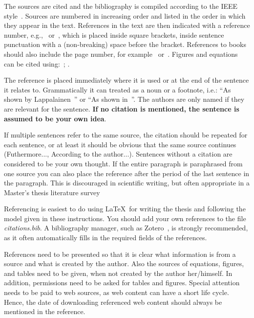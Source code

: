 The sources are cited and the bibliography is compiled according to
the IEEE style~\cite{ieeetransactions}.  Sources are numbered in
increasing order and listed in the order in which they appear in the
text.  References in the text are then indicated with a reference
number, e.g.,~\cite{lappalainen} or~\cite{lappalainen, acta, korpela},
which is placed inside square brackets, inside sentence punctuation
with a (non-breaking) space before the bracket. References to books
should also include the page number, for example~\cite[p.~15]{lappalainen}
or~\cite[pp.~15--17]{lappalainen}. Figures and equations can be cited
using:~\cite[Fig. 3]{lappalainen}; \cite[eq. (3)]{lappalainen}.

The reference is placed immediately where it is used or at the end of
the sentence it relates to. Grammatically it can treated as a noun or
a footnote, i.e.: ``As shown by Lappalainen~\cite{lappalainen}'' or
``As shown in~\cite{lappalainen}''. The authors are only named if they
are relevant for the sentence. \textbf{If no citation is mentioned,
the sentence is assumed to be your own idea}.

If multiple sentences refer to the same source, the citation should be
repeated for each sentence, or at least it should be obvious that the
same source continues (Futhermore..., According to the author...).
Sentences without a citation are considered to be your own thought.
If the entire paragraph is paraphrased from one source you can also
place the reference after the period of the last sentence in the
paragraph. This is discouraged in scientific writing, but often
appropriate in a Master's thesis literature survey~\cite{lappalainen}

Referencing is easiest to do using \LaTeX\ for writing the thesis and
following the model given in these instructions. You should add your
own references to the file \textit{citations.bib}. A bibliography
manager, such as Zotero~\cite{zotero,uniouluzotero}, is strongly
recommended, as it often automatically fills in the required fields
of the references. 

References need to be presented so that it is clear what information
is from a source and what is created by the author. Also the sources
of equations, figures, and tables need to be given, when not created
by the author her/himself. In addition, permissions need to be asked
for tables and figures. Special attention needs to be paid to web
sources, as web content can have a short life cycle. Hence, the date
of downloading referenced web content should always be mentioned in
the reference.

